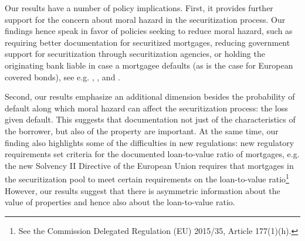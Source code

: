 \documentclass[11pt,twopage]{article}
\begin{document}
Our results have a number of policy implications. First, it provides
further support for the concern about moral hazard in the
securitization process. Our findings hence speak in favor of policies
seeking to reduce moral hazard, such as requiring better documentation
for securitized mortgages, reducing government support for
securitization through securitization agencies, or holding the
originating bank liable in case a mortgagee defaults (as is the case
for European covered bonds), see e.g. \cite{keys2008did},
\cite{tirole2011illiquidity}, and \cite{campbell2013mortgage}.

Second, our results emphasize an additional dimension besides the
probability of default along which moral hazard can affect the
securitization process: the loss given default. This suggests that
documentation not just of the characteristics of the borrower, but
also of the property are important. At the same time, our finding also
highlights some of the difficulties in new regulations: new regulatory
requirements set criteria for the documented loan-to-value ratio of
mortgages, e.g. the new Solvency II Directive of the European Union
requires that mortgages in the securitization pool to meet certain
requirements on the loan-to-value ratio\footnote{See the Commission
  Delegated Regulation (EU) 2015/35, Article 177(1)(h).} However, our
results suggest that there is asymmetric information about the value
of properties and hence also about the loan-to-value ratio.
\end{document}
